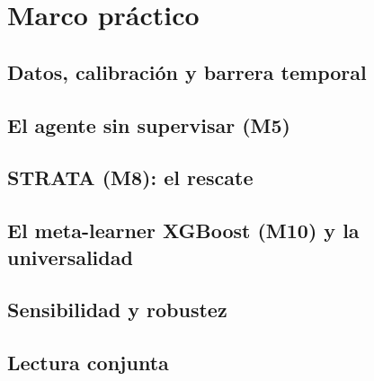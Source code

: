 \chapter{Marco práctico}
\label{cap:marco-practico}



\section{Datos, calibración y barrera temporal}
\label{sec:datos}

\section{El agente sin supervisar (M5)}
\label{sec:m5}

\section{STRATA (M8): el rescate}
\label{sec:m8}

\section{El meta-learner XGBoost (M10) y la universalidad}
\label{sec:m10}

\section{Sensibilidad y robustez}
\label{sec:robustez}

\section{Lectura conjunta}
\label{sec:lectura}
